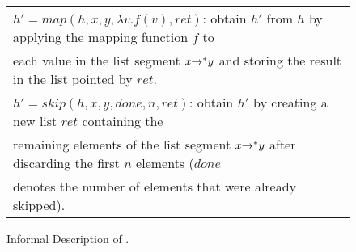 \documentclass[runningheads,a4paper]{llncs}
\newcommand*{\extended}{}
\begin{document}
\begin{figure*}[!hbt]
{\begin{tabular}{l}
    $h'=map(h,x,y,\lambda v.f(v),ret)$: obtain $h'$ from $h$ by applying the mapping function $f$ to\\
    each value in the list segment $x {\rightarrow^*} y$ and storing the result in the list pointed by $ret$.\\
$h'=skip(h,x,y,done,n,ret)$: obtain $h'$ by creating a new list $ret$ containing the\\ remaining elements of the list segment $x {\rightarrow^*} y$ after discarding the first $n$ elements ($done$\\ denotes the number of elements that were already skipped).\\
\end{tabular}
}
\caption{Informal Description of \logic.}
\label{fig:JCT}
\end{figure*}

\end{document}
